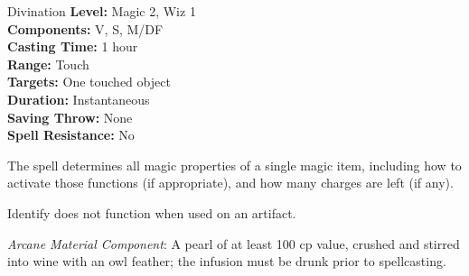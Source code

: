 {Divination}
{
	\textbf{Level:}
	Magic 2, Wiz 1\\
	\textbf{Components:}
	V, S, M/DF\\
	\textbf{Casting Time:}
	1 hour\\
	\textbf{Range:}
	Touch\\
	\textbf{Targets:}
	One touched object\\
	\textbf{Duration:}
	Instantaneous\\
	\textbf{Saving Throw:}
	None\\
	\textbf{Spell Resistance:}
	No\\
}
{
	The spell determines all magic properties of a single magic item, including how to activate those functions (if appropriate), and how many charges are left (if any).

	Identify does not function when used on an artifact.

	\textit{Arcane Material Component}:
	A pearl of at least 100 cp value, crushed and stirred into wine with an owl feather; the infusion must be drunk prior to spellcasting.

}
